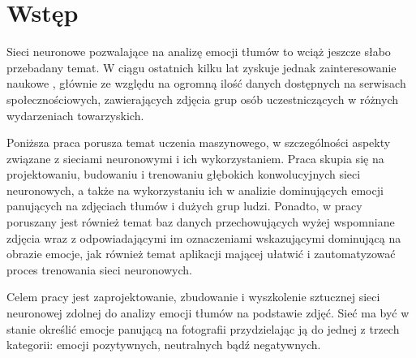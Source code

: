 \chapter{Wstęp}
\thispagestyle{chapterBeginStyle}
\label{chapter1}


Sieci neuronowe pozwalające na analizę emocji tłumów to wciąż jeszcze słabo przebadany temat. W ciągu ostatnich kilku lat zyskuje jednak zainteresowanie naukowe \cite{Group1}\cite{Group2}\cite{Group3}\cite{Group4}, głównie ze względu na ogromną ilość danych dostępnych na serwisach społecznościowych, zawierających zdjęcia grup osób uczestniczących w różnych wydarzeniach towarzyskich.

Poniższa praca porusza temat uczenia maszynowego, w szczególności aspekty związane z sieciami neuronowymi i ich wykorzystaniem. Praca skupia się na projektowaniu, budowaniu i trenowaniu głębokich konwolucyjnych sieci neuronowych, a także na wykorzystaniu ich w analizie dominujących emocji panujących na zdjęciach tłumów i dużych grup ludzi. Ponadto, w pracy poruszany jest również temat baz danych przechowujących wyżej wspomniane zdjęcia wraz z odpowiadającymi im oznaczeniami wskazującymi dominującą na obrazie emocje, jak również temat aplikacji mającej ułatwić i zautomatyzować proces trenowania sieci neuronowych.

Celem pracy jest zaprojektowanie, zbudowanie i wyszkolenie sztucznej sieci neuronowej zdolnej do analizy emocji tłumów na podstawie zdjęć. Sieć ma być w stanie określić emocje panującą na fotografii przydzielając ją do jednej z trzech kategorii: emocji pozytywnych, neutralnych bądź negatywnych.

